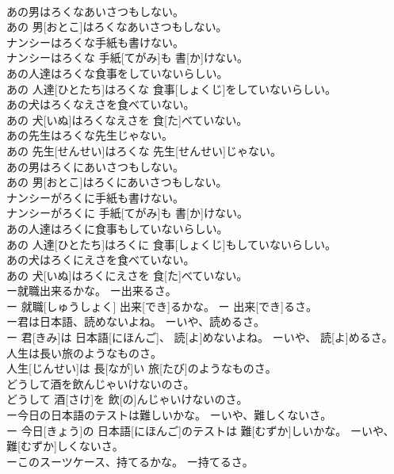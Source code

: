 \documentclass[8pt]{extreport}
\begin{document}
\begin{CJK}{UTF8}{min}
\\	あの男はろくなあいさつもしない。	
\\	あの 男[おとこ]はろくなあいさつもしない。
\\	ナンシーはろくな手紙も書けない。	
\\	ナンシーはろくな 手紙[てがみ]も 書[か]けない。
\\	あの人達はろくな食事をしていないらしい。	
\\	あの 人達[ひとたち]はろくな 食事[しょくじ]をしていないらしい。
\\	あの犬はろくなえさを食べていない。	
\\	あの 犬[いぬ]はろくなえさを 食[た]べていない。
\\	あの先生はろくな先生じゃない。	
\\	あの 先生[せんせい]はろくな 先生[せんせい]じゃない。
\\	あの男はろくにあいさつもしない。	
\\	あの 男[おとこ]はろくにあいさつもしない。
\\	ナンシーがろくに手紙も書けない。	
\\	ナンシーがろくに 手紙[てがみ]も 書[か]けない。
\\	あの人達はろくに食事もしていないらしい。	
\\	あの 人達[ひとたち]はろくに 食事[しょくじ]もしていないらしい。
\\	あの犬はろくにえさを食べていない。	
\\	あの 犬[いぬ]はろくにえさを 食[た]べていない。
\\	ー就職出来るかな。 ー出来るさ。	
\\	ー 就職[しゅうしょく] 出来[でき]るかな。 ー 出来[でき]るさ。
\\	ー君は日本語、読めないよね。 ーいや、読めるさ。	
\\	ー 君[きみ]は 日本語[にほんご]、 読[よ]めないよね。 ーいや、 読[よ]めるさ。
\\	人生は長い旅のようなものさ。	
\\	人生[じんせい]は 長[なが]い 旅[たび]のようなものさ。
\\	どうして酒を飲んじゃいけないのさ。	
\\	どうして 酒[さけ]を 飲[の]んじゃいけないのさ。
\\	ー今日の日本語のテストは難しいかな。 ーいや、難しくないさ。	
\\	ー 今日[きょう]の 日本語[にほんご]のテストは 難[むずか]しいかな。 ーいや、 難[むずか]しくないさ。
\\	ーこのスーツケース、持てるかな。 ー持てるさ。	

\end{CJK}
\end{document}
